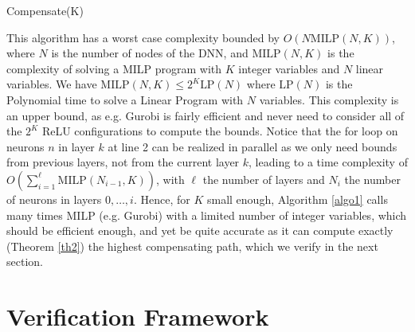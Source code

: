 \documentclass{llncs}
\newcommand{\MILP}{{\textrm{MILP}}}
\newcommand{\LP}{{\textrm{LP}}}
\begin{document}
	
\begin{algorithm}[b!]
	\caption{Compensate(K)}
	\label{algo1}
	
	 
	 \end{algorithm}	
	
	
	

This algorithm has a worst case complexity bounded by $O(N \MILP(N,K))$, 
where $N$ is the number of nodes of the DNN, 
and $\MILP(N,K)$ is the complexity of solving a MILP program with $K$ integer variables and $N$ linear variables.
We have $\MILP(N,K) \leq 2^K \LP(N)$ where $\LP(N)$ is the Polynomial time to solve a Linear Program with $N$ variables.
This complexity is an upper bound, as e.g. Gurobi is fairly efficient and never need to consider all of the $2^K$ ReLU configurations to compute the bounds.
Notice that the for loop on neurons $n$ in layer $k$ at line 2 can be realized in parallel as we only need bounds from previous layers, not from the current layer $k$, 
leading to a time complexity of $O(\sum_{i=1}^{\ell} \MILP(N_{i-1},K))$, with $\ell$ the number of layers and $N_i$ the number of neurons in layers $0, \ldots, i$.
Hence, for $K$ small enough, Algorithm \ref{algo1} calls many times MILP (e.g. Gurobi)
with a limited number of integer variables, which should be efficient enough, and yet be quite accurate as it can compute exactly (Theorem \ref{th2}) the highest compensating path, which we verify in the next section.





\iffalse
\section{Verification Framework}



\end{document}
